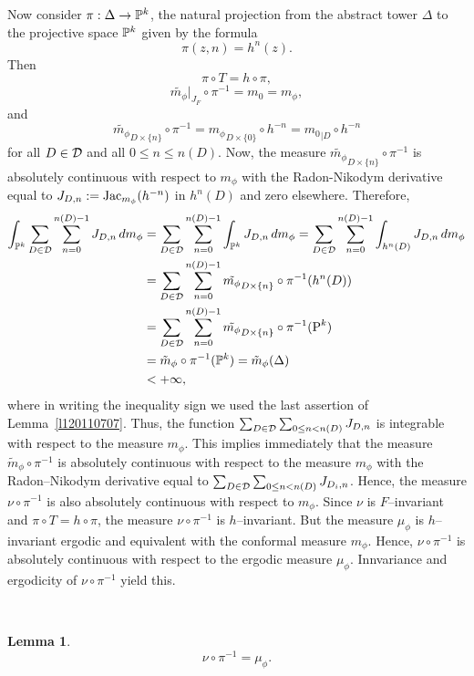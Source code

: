 \documentclass[12pt]{amsart}
\numberwithin{equation}{section}
\newtheorem{lem}[thm]{Lemma}
\def\De{\Delta}               \def\e{\varepsilon}          \def\f{\phi}
\begin{document}
\fr Now consider $\pi:\De\to\Pk$, the natural
projection from the abstract tower $\De$ to the projective space ${\mathbb P}^k$
given by the formula
$$
\pi(z,n)=h^n(z).
$$
Then
\begin{equation}\label{eq120110623}
\pi\circ T =h\circ \pi,
\end{equation}
$$
{\tilde {m_\phi}}\big|_{J_F}\circ\pi^{-1}=m_0=m_\phi,
$$ 
and  
$$
\tilde{m_\phi}_{D\times\{n\}} \circ\pi^{-1} 
={m_\phi}_{D\times\{0\}}\circ h^{-n}
={m_0}_{|D}\circ h^{-n}
$$ 
for all $D\in\mathcal D$ and all $0\le n\le n(D)$.
Now, the measure $\tilde{m_\phi}_{D\times\{n\}} \circ\pi^{-1}$ is
absolutely continuous 
with respect to $m_\phi$ with the Radon-Nikodym derivative equal to
$J_{D,n}:=\text{{\rm Jac}}_{m_\phi}(h^{-n})$ in $h^n(D)$ and zero elsewhere. Therefore,
$$
\aligned
\int_{\Pk}\sum_{D\in\cD}\sum_{n=0}^{n(D)-1}J_{D,n}\,dm_\phi
&=\sum_{D\in\cD}\sum_{n=0}^{n(D)-1}\int_{\Pk}J_{D,n}\,dm_\phi 
 =\sum_{D\in\cD}\sum_{n=0}^{n(D)-1}\int_{h^n(D)}J_{D,n}\,dm_\phi \\
&=\sum_{D\in\cD}\sum_{n=0}^{n(D)-1}\tilde{m_\phi}_{D\times\{n\}}
       \circ\pi^{-1}(h^n(D))\\     
&=\sum_{D\in\cD}\sum_{n=0}^{n(D)-1}\tilde{m_\phi}_{D\times\{n\}}
       \circ\pi^{-1}(\P^k)\\   
&=\tilde m_\phi\circ\pi^{-1}(\Pk) 
 =\tilde m_\phi(\De) \\
&<+\infty,
\endaligned
$$ 
where in writing the inequality sign we used the last assertion of
Lemma~\ref{l120110707}.
Thus, the function $\sum_{D\in\mathcal D}\sum_{0\le n<n(D)}J_{D,n}$ is integrable
with respect to the measure $m_\phi$. This implies immediately that
the measure $\tilde m_\phi\circ\pi^{-1}$ is absolutely continuous with
respect to the measure $m_\phi$ with the Radon--Nikodym derivative
equal to $\sum_{D\in\mathcal D}\sum_{0\le n<n(D)}J_{D_i,n}$.  
Hence, the measure $\nu\circ\pi^{-1}$ is also absolutely continuous
with respect to $m_\phi$. Since $\nu$ is $F$--invariant and $\pi\circ
T =h\circ \pi$, the measure $\nu\circ\pi^{-1}$ is $h$--invariant. 
But the measure $\mu_\phi$ is $h$--invariant ergodic and
equivalent with the conformal measure $m_\phi$. Hence, $\nu\circ\pi^{-1}$
is absolutely continuous with respect to the ergodic
measure $\mu_\phi$. Innvariance and ergodicity of $\nu\circ\pi^{-1}$
yield this.  

\

\begin{lem}\label{l120110623}
$$
\nu\circ\pi^{-1}=\mu_\phi.
$$
\end{lem} 
\end{document}
